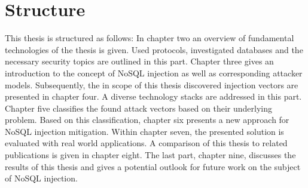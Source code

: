 \section{Structure}
This thesis is  structured as follows: In chapter two an overview of fundamental technologies of the thesis is given. Used protocols, investigated databases and the necessary security topics are outlined in this part. Chapter three gives an introduction to the concept of NoSQL injection as well as corresponding attacker models. Subsequently, the in scope of this thesis discovered injection vectors are presented in chapter four. A diverse technology stacks are addressed in this part. Chapter five classifies the found attack vectors based on their underlying problem. Based on this classification, chapter six presents a new approach for NoSQL injection mitigation. Within chapter seven, the presented solution is evaluated with real world applications. A comparison of this thesis to related publications is given in chapter eight. The last part, chapter nine, discusses the results of this thesis and gives a potential outlook for future work on the subject of NoSQL injection.